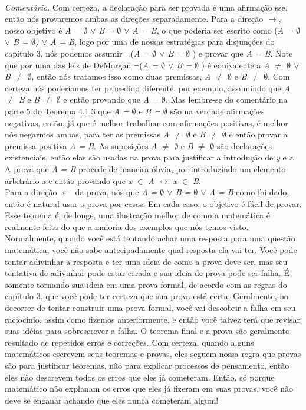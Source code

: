  \\
 \textit{Comentário.} Com certeza, a declaração para ser provada é uma afirmação sse, então nós provaremos ambas as direções separadamente. Para a direção $\rightarrow$, nosso objetivo é \textit{A = $\emptyset$ $\vee$ B =  $\emptyset$ $\vee$ A = B}, o que poderia ser escrito como (\textit{A = $\emptyset$ $\vee$ B = $\emptyset$) $\vee$ A = B}, logo por uma de nossas estratégias para disjunções do capítulo 3, nós podemos assumir  $\neg$(\textit{A = $\emptyset$ $\vee$ B = $\emptyset$ }) e provar que \textit{A = B}. Note que por uma das leis de DeMorgan $\neg$(\textit{A = $\emptyset$ $\vee$ B = $\emptyset$ }) é equivalente a \textit{A  $\neq$ $\emptyset$  $\vee$  B $\neq$ $\emptyset$}, então nós tratamos isso como duas premissas, \textit{A  $\neq$ $\emptyset$ }e \textit{B $\neq$ $\emptyset$}. Com certeza nós poderíamos ter procedido diferente, por exemplo, assumindo que \textit{A $\neq$ B} e \textit{B $\neq$ $\emptyset$} e então provando que \textit{A = $\emptyset$}. Mas lembre-se do comentário na parte 5 do Teorema 4.1.3 que \textit{A = $\emptyset$} e \textit{B = $\emptyset$} são na verdade afirmações negativas, então, já que é melhor trabalhar com afirmações positivas, é melhor nós negarmos ambas, para ter as premissas  \textit{A  $\neq$ $\emptyset$ }e \textit{B $\neq$ $\emptyset$} e então provar a premissa positiva \textit{A  = B}. As suposições \textit{A  $\neq$ $\emptyset$ }e \textit{B $\neq$ $\emptyset$} são declarações existenciais, então elas são usadas na prova para justificar a introdução de \textit{y} e \textit{z}. A prova que \textit{A = B} procede de maneira óbvia, por introduzindo um elemento arbitrário \textit{x} e então provando que \textit{x $\in$ A $\leftrightarrow$ x $\in$ B}.
 \\
 \indent	Para a direção $\leftarrow$ da prova, nós que \textit{A = $\emptyset$ $\vee$ B = $\emptyset$ $\vee$ A = B} como foi dado, então é natural usar a prova por casos. Em cada caso, o objetivo é fácil de provar. 
    \\
\indent    Esse teorema é, de longe, uma ilustração melhor de como a matemática é realmente feita do que a maioria dos exemplos que nós temos visto. Normalmente, quando você está tentando achar uma resposta para uma questão matemática, você não sabe antecipadamente qual resposta ela vai ter. Você pode tentar adivinhar a resposta e ter uma ideia de como a prova deve ser, mas seu tentativa de adivinhar pode estar errada e sua ideia de prova pode ser falha. É somente tornando sua ideia em uma prova formal, de acordo com as regras do capítulo 3, que você pode ter certeza que sua prova está certa. Geralmente, no decorrer de tentar construir uma prova formal, você vai descobrir a falha em seu raciocínio, assim como fizemos anteriormente, e então você talvez terá que revisar suas idéias para sobrescrever a falha. O teorema final e a prova são geralmente resultado de repetidos erros e correções. Com certeza, quando alguns matemáticos escrevem seus teoremas e provas, eles seguem nossa regra que provas são para justificar teoremas, não para explicar processos de pensamento, então eles não descrevem todos os erros que eles já cometeram. Então, só porque matemático não explanam os erros que eles já fizeram em suas provas, você não deve se enganar achando que eles nunca cometeram algum!
